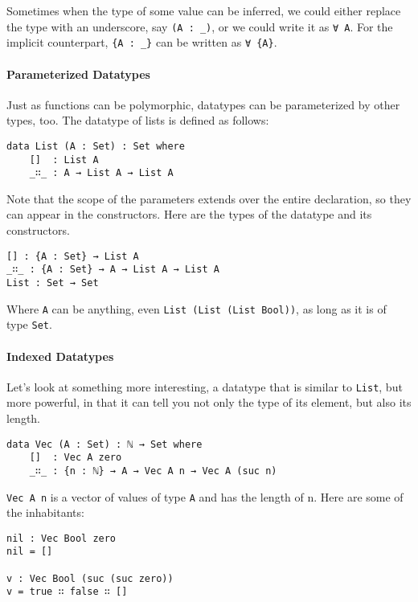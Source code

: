 \documentclass[14pt, a4paper]{article}
\begin{document}
Sometimes when the type of some value can be inferred, we could either replace
the type with an underscore, say {\lstinline|(A : _)|}, or we could write it as
{\lstinline|∀ A|}. For the implicit counterpart, {\lstinline|{A : _}|} can be
written as {\lstinline|∀ {A}|}.

\paragraph{Parameterized Datatypes}

Just as functions can be polymorphic, datatypes can be parameterized by other
types, too. The datatype of lists is defined as follows:

\begin{lstlisting}
data List (A : Set) : Set where
    []  : List A
    _∷_ : A → List A → List A
\end{lstlisting}

Note that the scope of the parameters extends over the entire declaration, so
they can appear in the constructors.
Here are the types of the datatype and its constructors.

\begin{lstlisting}
[] : {A : Set} → List A
_∷_ : {A : Set} → A → List A → List A
List : Set → Set
\end{lstlisting}

Where {\lstinline|A|} can be anything, even {\lstinline|List (List (List Bool))|},
as long as it is of type {\lstinline|Set|}.

\paragraph{Indexed Datatypes}

Let's look at something more interesting, a datatype that is similar to
{\lstinline|List|}, but more powerful, in that it can tell you not only the type
of its element, but also its length.

\begin{lstlisting}
data Vec (A : Set) : ℕ → Set where
    []  : Vec A zero
    _∷_ : {n : ℕ} → A → Vec A n → Vec A (suc n)
\end{lstlisting}

{\lstinline|Vec A n|} is a vector of values of type {\lstinline|A|} and
has the length of n. Here are some of the inhabitants:

\begin{lstlisting}
nil : Vec Bool zero
nil = []

v : Vec Bool (suc (suc zero))
v = true ∷ false ∷ []
\end{lstlisting}
\end{document}
